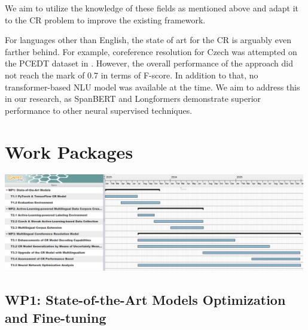 We aim to utilize the knowledge of these fields as mentioned above and adapt it to the CR problem to improve the existing framework.

For languages other than English, the state of art for the CR is arguably even farther behind. 
For example, coreference resolution for Czech was attempted on the PCEDT dataset \cite{pcedt-Hajic2012} in \cite{cr-cz-Novak17}. However, the overall performance of the approach did not reach the mark of 0.7 in terms of F-score. 
In addition to that, no transformer-based NLU model was available at the time. 
We aim to address this in our research, as SpanBERT and Longformers demonstrate superior performance to other neural supervised techniques.

\section{Work Packages}\label{sec:wp}

\includegraphics[width=0.99\textwidth]{./figs/Timeschedule}

\subsection*{WP1: State-of-the-Art Models Optimization and Fine-tuning}

%
%
%
%


